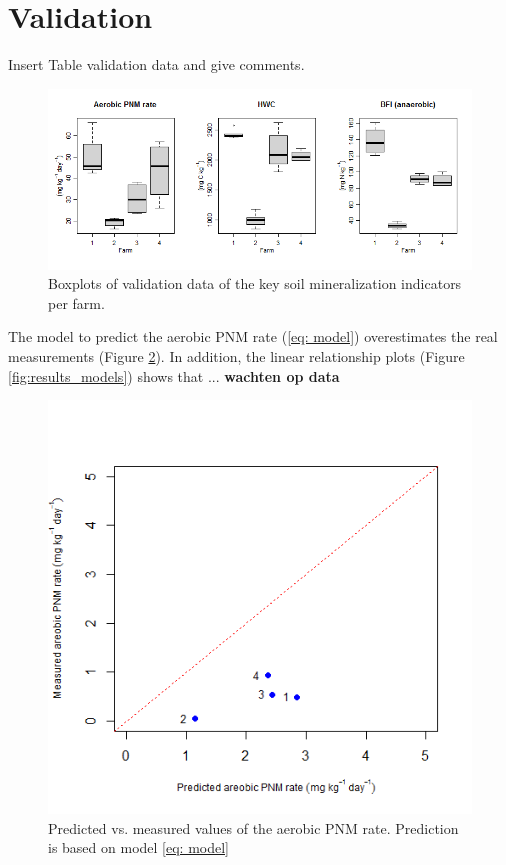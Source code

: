 \documentclass[10pt,twoside,dutch,english]{report}
\begin{document}
\begin{table}[hb]
\begin{tabu}
		\end{tabu}
		\label{tab: resuls_mods}
	\end{table}


\section{Validation}
Insert Table validation data and give comments.
	\begin{figure}[ht] %
		\centering
		\includegraphics[width=1\linewidth]{results_valbox}
		\caption{Boxplots of validation data of the key soil mineralization indicators per farm.}
		\label{fig:results_valbox}
	\end{figure}

The model to predict the aerobic PNM rate (\ref{eq: model}) overestimates the real measurements (Figure \ref{fig:results_pm}). In addition, the linear relationship plots (Figure \ref{fig:results_models}) shows that ... \textbf{wachten op data}  

	\begin{figure}[ht] %
		\includegraphics[width=0.7\linewidth]{results_pm}
		\caption{Predicted vs. measured values of the aerobic PNM rate. Prediction is based on model \ref{eq: model}}
		\label{fig:results_pm}
	\end{figure}
	
\end{document}
